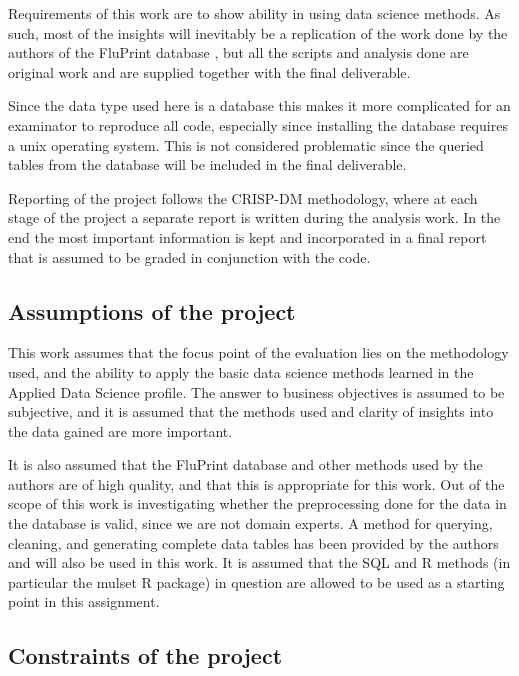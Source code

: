 Requirements of this work are to show ability in using data science methods.
As such, most of the insights will inevitably be a replication of the work done
by the authors of the FluPrint database \cite{tomicSIMONAutomatedMachine2019},
but all the scripts and analysis done are original work and are supplied
together with the final deliverable.

Since the data type used here is a database this makes it more complicated for
an examinator to reproduce all code, especially since installing the database
requires a unix operating system. This is not considered problematic
since the queried tables from the database will be included in the final
deliverable.

Reporting of the project follows the CRISP-DM methodology, where at each
stage of the project a separate report is written during the analysis work. In
the end the most important information is kept and incorporated in a final
report that is assumed to be graded in conjunction with the code.

\subsection{Assumptions of the project}

This work assumes that the focus point of the evaluation lies on the
methodology used, and the ability to apply the basic data science methods
learned in the Applied Data Science profile. The answer to business objectives
is assumed to be subjective, and it is assumed that the methods used and
clarity of insights into the data gained are more important.

It is also assumed that the FluPrint database and other methods used by the
authors \cite{tomicFluPRINTDatasetMultidimensional2019,
tomicSIMONAutomatedMachine2019} are of high quality, and that this is
appropriate for this work. Out of the scope of this work is investigating
whether the preprocessing done for the data in the database is valid, since we
are not domain experts. A method for querying, cleaning, and generating
complete data tables has been provided by the authors and will also be used in
this work. It is assumed that the SQL and R methods (in particular the mulset R
package) in question are allowed to be used as a starting point in this
assignment.

\subsection{Constraints of the project}

